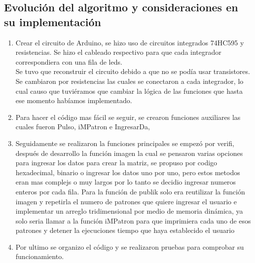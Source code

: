 \documentclass{article}
\begin{document}
\subsection{Evolución del algoritmo y consideraciones en su implementación}
\begin{enumerate}
    \item Crear el circuito de Arduino, se hizo uso de circuitos integrados 74HC595 y resistencias. Se hizo el cableado respectivo para que cada integrador correspondiera con una fila de leds.\\
    Se tuvo que reconstruir el circuito debido a que no se podía usar transistores. Se cambiaron por resistencias las cuales se conectaron a cada integrador, lo cual causo que tuviéramos que cambiar la lógica de las funciones que hasta ese momento habíamos implementado.
    \item Para hacer el código mas fácil se seguir, se crearon funciones auxiliares las cuales fueron Pulso, iMPatron e IngresarDa,
    \item Seguidamente se realizaron la funciones principales se empezó por verifi, después de desarrollo la función imagen la cual se pensaron varias opciones para ingresar los datos para crear la matriz, se propuso por codigo hexadecimal, binario o ingresar los datos uno por uno, pero estos metodos eran mas complejs o muy largos por lo tanto se decidio ingresar numeros enteros por cada fila. Para la función de publik solo era reutilizar la función imagen y repetirla el numero de patrones que quiere ingresar el usuario e implementar un arreglo tridimensional por medio de memoria dinámica, ya solo seria llamar a la función iMPatron para que imprimiera cada uno de esos patrones y  detener la ejecuciones tiempo que haya establecido el usuario
    \item Por ultimo se organizo el código y se realizaron pruebas para comprobar su funcionamiento.
\end{enumerate}
\end{document}
